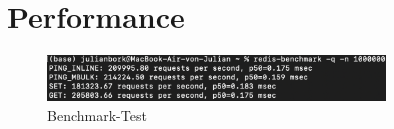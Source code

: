 
\setcounter{section}{0}
\renewcommand\thesection{\Alph{section}}
\addchap{\langanhang}


\section{Performance}

\begin{figure}[H]
	\centering
	\includegraphics[width=0.8\textwidth]{images/redis-benchmark.png}
	\caption{Benchmark-Test}
	\label{fig:redis-benchmark}
\end{figure}
 
